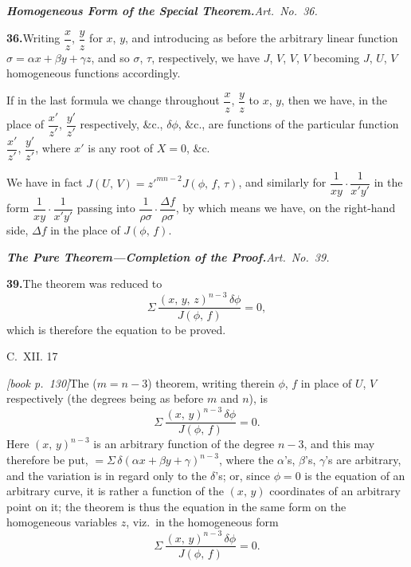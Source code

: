 \documentclass[11pt,a4paper]{article}
\theoremstyle{plain}
\theoremstyle{definition}
\theoremstyle{remark}
\begin{document}
\bigskip

\noindent\textit{\textbf{Homogeneous Form of the Special Theorem.}\quad Art.\ No.\ 36.}

\medskip\noindent\textbf{36.}\quad Writing $\dfrac{x}{z}$, $\dfrac{y}{z}$ for $x$, $y$, and introducing as before the arbitrary linear function $\sigma = \alpha x + \beta y + \gamma z$, and so $\sigma$, $\tau$, respectively, we have $J$, $V$, $V$, $V$ becoming $J$, $U$, $V$ homogeneous functions accordingly.

If in the last formula we change throughout $\dfrac{x}{z}$, $\dfrac{y}{z}$ to $x$, $y$, then we have, in the place of $\dfrac{x'}{z'}$, $\dfrac{y'}{z'}$ respectively, \&c., $\delta\phi$, \&c., are functions of the particular function $\dfrac{x'}{z'}$, $\dfrac{y'}{z'}$, where $x'$ is any root of $X = 0$, \&c.

We have in fact $J(U,\,V) = z'^{mn-2}J(\phi,\,f,\,\tau)$, and similarly for $\dfrac{1}{xy} \cdot \dfrac{1}{x'y'}$ in the form $\dfrac{1}{xy} \cdot \dfrac{1}{x'y'}$ passing into $\dfrac{1}{\rho\sigma} \cdot \dfrac{\Delta f}{\rho\sigma}$, by which means we have, on the right-hand side, $\Delta f$ in the place of $J(\phi,\,f)$.

\medskip\noindent\textit{\textbf{The Pure Theorem---Completion of the Proof.}\quad Art.\ No.\ 39.}

\medskip\noindent\textbf{39.}\quad The theorem was reduced to
\[
\Sigma\,\frac{(x,\,y,\,z)^{n-3}\,\delta\phi}{J(\phi,\,f)} = 0,
\]
which is therefore the equation to be proved.

C.\ XII. \hfill 17

\noindent\textit{[book p.~130]}\quad The ($m = n - 3$) theorem, writing therein $\phi$, $f$ in place of $U$, $V$ respectively (the degrees being as before $m$ and $n$), is
\[
\Sigma\,\frac{(x,\,y)^{n-3}\,\delta\phi}{J(\phi,\,f)} = 0.
\]
Here $(x,\,y)^{n-3}$ is an arbitrary function of the degree $n - 3$, and this may therefore be put, $= \Sigma\,\delta(\alpha x + \beta y + \gamma)^{n-3}$, where the $\alpha$'s, $\beta$'s, $\gamma$'s are arbitrary, and the variation is in regard only to the $\delta$'s; or, since $\phi = 0$ is the equation of an arbitrary curve, it is rather a function of the $(x,\,y)$ coordinates of an arbitrary point on it; the theorem is thus the equation in the same form on the homogeneous variables $z$, viz.\ in the homogeneous form
\[
\Sigma\,\frac{(x,\,y)^{n-3}\,\delta\phi}{J(\phi,\,f)} = 0.
\]
\end{document}

